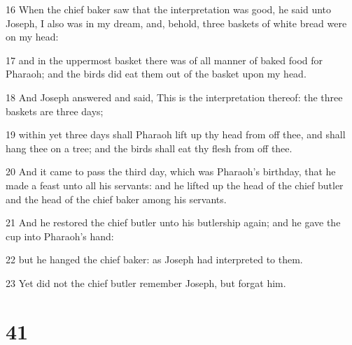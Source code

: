 \par 16 When the chief baker saw that the interpretation was good, he said unto Joseph, I also was in my dream, and, behold, three baskets of white bread were on my head:
\par 17 and in the uppermost basket there was of all manner of baked food for Pharaoh; and the birds did eat them out of the basket upon my head.
\par 18 And Joseph answered and said, This is the interpretation thereof: the three baskets are three days;
\par 19 within yet three days shall Pharaoh lift up thy head from off thee, and shall hang thee on a tree; and the birds shall eat thy flesh from off thee.
\par 20 And it came to pass the third day, which was Pharaoh's birthday, that he made a feast unto all his servants: and he lifted up the head of the chief butler and the head of the chief baker among his servants.
\par 21 And he restored the chief butler unto his butlership again; and he gave the cup into Pharaoh's hand:
\par 22 but he hanged the chief baker: as Joseph had interpreted to them.
\par 23 Yet did not the chief butler remember Joseph, but forgat him.

\chapter{41}


